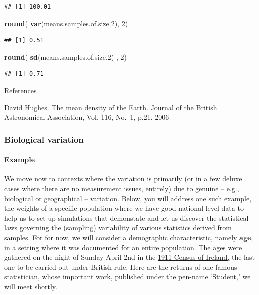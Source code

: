\documentclass[
]{article}
\newenvironment{Shaded}{\begin{snugshade}}{\end{snugshade}}
\newcommand{\DecValTok}[1]{\textcolor[rgb]{0.00,0.00,0.81}{#1}}
\newcommand{\FloatTok}[1]{\textcolor[rgb]{0.00,0.00,0.81}{#1}}
\newcommand{\KeywordTok}[1]{\textcolor[rgb]{0.13,0.29,0.53}{\textbf{#1}}}
\newcommand{\NormalTok}[1]{#1}
\begin{document}
\begin{verbatim}
## [1] 100.01
\end{verbatim}

\begin{Shaded}
\begin{Highlighting}[]
\KeywordTok{round}\NormalTok{( }\KeywordTok{var}\NormalTok{(means.samples.of.size}\FloatTok{.2}\NormalTok{), }\DecValTok{2}\NormalTok{)}
\end{Highlighting}
\end{Shaded}

\begin{verbatim}
## [1] 0.51
\end{verbatim}

\begin{Shaded}
\begin{Highlighting}[]
\KeywordTok{round}\NormalTok{( }\KeywordTok{sd}\NormalTok{(means.samples.of.size}\FloatTok{.2}\NormalTok{) , }\DecValTok{2}\NormalTok{)}
\end{Highlighting}
\end{Shaded}

\begin{verbatim}
## [1] 0.71
\end{verbatim}

References

David Hughes. The mean density of the Earth. Journal of the British
Astronomical Association, Vol. 116, No.~1, p.21. 2006

\hypertarget{biological-variation}{%
\subsubsection{Biological variation}\label{biological-variation}}

\hypertarget{example}{%
\paragraph{Example}\label{example}}

We move now to contexts where the variation is primarily (or in a few
deluxe cases where there are no measurement issues, entirely) due to
genuine -- e.g., biological or geographical -- variation. Below, you
will address one such example, the weights of a specific population
where we have good national-level data to help us to set up simulations
that demonstate and let us discover the statistical laws governing the
(sampling) variability of various statistics derived from samples. For
for now, we will consider a demographic characteristic, namely
\textbf{age}, in a setting where it was documented for an entire
population. The ages were gathered on the night of Sunday April 2nd in
the
\href{http://www.census.nationalarchives.ie/help/about19011911census.html}{1911
Census of Ireland,} the last one to be carried out under British rule.
Here are the returns of one famous statistician, whose important work,
published under the pen-name
\href{http://www.census.nationalarchives.ie/reels/nai000230598/}{`Student,'}
we will meet shortly.
\end{document}
